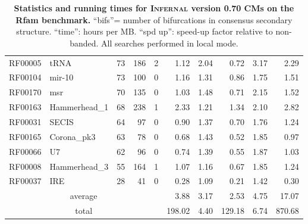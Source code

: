 \documentclass[11pt]{article}
\renewcommand{\baselinestretch}{1.5}
\renewcommand{\baselinestretch}{1.5}
\begin{document}
\begin{table}
\begin{center}
\begin{tabular}{|ll|rrr|rr|rr|r|}
RF00005 & tRNA & 73 & 186 & 2 & 1.12 & 2.04 & 0.72 & 3.17 & 2.29 \\  
RF00104 & mir-10 & 73 & 100 & 0 & 1.16 & 1.31 & 0.86 & 1.75 & 1.51 \\  
RF00170 & msr & 70 & 135 & 0 & 1.03 & 1.48 & 0.71 & 2.15 & 1.52 \\  
RF00163 & Hammerhead\_1 & 68 & 238 & 1 & 2.33 & 1.21 & 1.34 & 2.10 & 2.82 \\  
RF00031 & SECIS & 64 & 97 & 0 & 0.90 & 1.37 & 0.70 & 1.76 & 1.24 \\  
RF00165 & Corona\_pk3 & 63 & 78 & 0 & 0.68 & 1.43 & 0.52 & 1.85 & 0.97 \\  
RF00066 & U7 & 62 & 96 & 0 & 0.74 & 1.39 & 0.55 & 1.87 & 1.03 \\  
RF00008 & Hammerhead\_3 & 55 & 164 & 1 & 1.07 & 1.16 & 0.67 & 1.85 & 1.24 \\  
RF00037 & IRE & 28 & 41 & 0 & 0.28 & 1.09 & 0.21 & 1.42 & 0.30 \\ \hline 
\multicolumn{5}{|c|}{average} & 3.88 & 3.17 & 2.53 & 4.75 & 17.07 \\ 
\multicolumn{5}{|c|}{total}   & 198.02 & 4.40 & 129.18 & 6.74 & 870.68 \\ \hline 
\end{tabular}
\end{center}

\caption{\textbf{Statistics and running times for
      \textsc{Infernal} version 0.70 CMs on the Rfam benchmark.} ``bifs''=
      number of bifurcations in consensus secondary
      structure. ``time'': hours per MB. ``spd up'': speed-up factor
      relative to non-banded. All searches performed in local mode.}
\label{tbl:rmarkbtimes_l}
\end{table}
\renewcommand{\baselinestretch}{1.5}

\newpage

\fi
\end{document}
